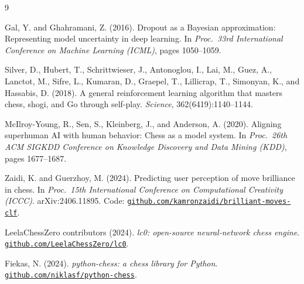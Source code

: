 \documentclass[11pt,a4paper]{article}
\begin{document}
\begin{thebibliography}{9}

Gal, Y. and Ghahramani, Z. (2016).
\newblock Dropout as a {B}ayesian approximation: Representing model uncertainty
  in deep learning.
\newblock In \emph{Proc.\ 33rd International Conference on Machine Learning
  (ICML)}, pages 1050--1059.

Silver, D., Hubert, T., Schrittwieser, J., Antonoglou, I., Lai, M.,
  Guez, A., Lanctot, M., Sifre, L., Kumaran, D., Graepel, T.,
  Lillicrap, T., Simonyan, K., and Hassabis, D. (2018).
\newblock A general reinforcement learning algorithm that masters chess, shogi,
  and Go through self-play.
\newblock \emph{Science}, 362(6419):1140--1144.

McIlroy-Young, R., Sen, S., Kleinberg, J., and Anderson, A. (2020).
\newblock Aligning superhuman {AI} with human behavior: Chess as a model
  system.
\newblock In \emph{Proc.\ 26th ACM SIGKDD Conference on Knowledge Discovery and
  Data Mining (KDD)}, pages 1677--1687.

Zaidi, K. and Guerzhoy, M. (2024).
\newblock Predicting user perception of move brilliance in chess.
\newblock In \emph{Proc.\ 15th International Conference on
  Computational Creativity (ICCC)}. arXiv:2406.11895.
\newblock Code:
  \href{https://github.com/kamronzaidi/brilliant-moves-clf}%
       {\texttt{github.com/kamronzaidi/brilliant-moves-clf}}.

LeelaChessZero contributors (2024).
\newblock \emph{lc0: open-source neural-network chess engine}.
\newblock \href{https://github.com/LeelaChessZero/lc0}%
               {\texttt{github.com/LeelaChessZero/lc0}}.

Fiekas, N. (2024).
\newblock \emph{python-chess: a chess library for Python}.
\newblock \href{https://github.com/niklasf/python-chess}%
               {\texttt{github.com/niklasf/python-chess}}.

\end{thebibliography}
\end{document}
